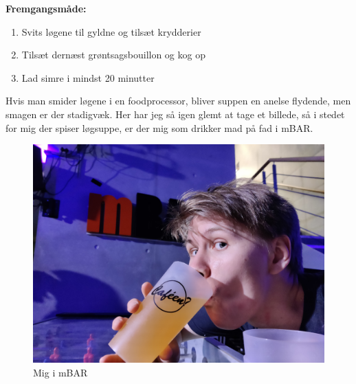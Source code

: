 \documentclass{book}
\begin{document}
\begin{minipage}[t]{0.5\textwidth}
\textbf{Fremgangsmåde:}
\begin{enumerate}
    \item Svits løgene til gyldne og tilsæt krydderier
    \item Tilsæt dernæst grøntsagsbouillon og kog op
    \item Lad simre i mindst 20 minutter
\end{enumerate}
\end{minipage}
Hvis man smider løgene i en foodprocessor, bliver suppen en anelse flydende, men smagen er der stadigvæk.
\newpage 
Her har jeg så igen glemt at tage et billede, så i stedet for mig der spiser løgsuppe, er der mig som drikker mad på fad i mBAR.
\begin{figure}
    \centering
    \includegraphics[width=0.5\linewidth]{mBAR.jpg}
    \caption{Mig i mBAR}
    
\end{figure}
\newpage 
\end{document}
